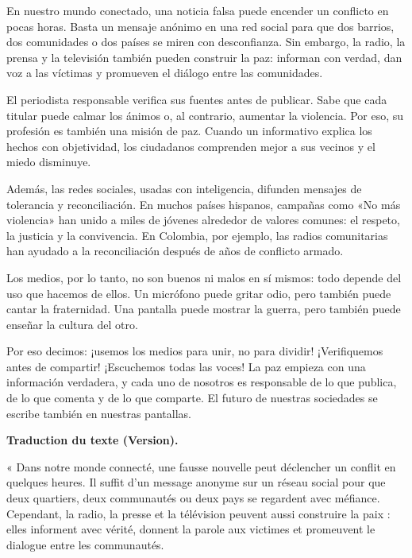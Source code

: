 \documentclass[11pt]{article}
\begin{document}
\begin{textebox}
En nuestro mundo conectado, una noticia falsa puede encender un conflicto en pocas horas. Basta un mensaje anónimo en una red social para que dos barrios, dos comunidades o dos países se miren con desconfianza. Sin embargo, la radio, la prensa y la televisión también pueden construir la paz: informan con verdad, dan voz a las víctimas y promueven el diálogo entre las comunidades.

El periodista responsable verifica sus fuentes antes de publicar. Sabe que cada titular puede calmar los ánimos o, al contrario, aumentar la violencia. Por eso, su profesión es también una misión de paz. Cuando un informativo explica los hechos con objetividad, los ciudadanos comprenden mejor a sus vecinos y el miedo disminuye.

Además, las redes sociales, usadas con inteligencia, difunden mensajes de tolerancia y reconciliación. En muchos países hispanos, campañas como «No más violencia» han unido a miles de jóvenes alrededor de valores comunes: el respeto, la justicia y la convivencia. En Colombia, por ejemplo, las radios comunitarias han ayudado a la reconciliación después de años de conflicto armado.

Los medios, por lo tanto, no son buenos ni malos en sí mismos: todo depende del uso que hacemos de ellos. Un micrófono puede gritar odio, pero también puede cantar la fraternidad. Una pantalla puede mostrar la guerra, pero también puede enseñar la cultura del otro.

Por eso decimos: ¡usemos los medios para unir, no para dividir! ¡Verifiquemos antes de compartir! ¡Escuchemos todas las voces! La paz empieza con una información verdadera, y cada uno de nosotros es responsable de lo que publica, de lo que comenta y de lo que comparte. El futuro de nuestras sociedades se escribe también en nuestras pantallas.
\end{textebox}

\textbf{Traduction du texte (Version).}\par
« Dans notre monde connecté, une fausse nouvelle peut déclencher un conflit en quelques heures. Il suffit d'un message anonyme sur un réseau social pour que deux quartiers, deux communautés ou deux pays se regardent avec méfiance. Cependant, la radio, la presse et la télévision peuvent aussi construire la paix : elles informent avec vérité, donnent la parole aux victimes et promeuvent le dialogue entre les communautés.
\end{document}
